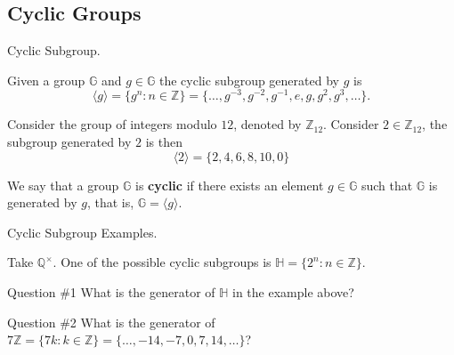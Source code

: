 \documentclass{beamer}
\begin{document}
  \subsection{Cyclic Groups}

  \begin{frame}{Cyclic Subgroup.}
    \begin{definition}
      Given a group $\mathbb{G}$ and $g \in \mathbb{G}$ the cyclic subgroup generated by $g$ is
      \begin{equation*}
          \langle g \rangle = \{g^n: n \in \mathbb{Z}\} = \{\dots,g^{-3}, g^{-2}, g^{-1}, e, g, g^2, g^3, \dots\}.
      \end{equation*}
    \end{definition}
    \pause

    \begin{example}
        Consider the group of integers modulo $12$, denoted by $\mathbb{Z}_{12}$. Consider $2 \in \mathbb{Z}_{12}$, the subgroup generated by $2$ is then
        \begin{equation*}
            \langle 2 \rangle = \{2,4,6,8,10, 0\}
        \end{equation*}
    \end{example}

    \pause
    \begin{definition}
      We say that a group $\mathbb{G}$ is \textbf{cyclic} if there exists an element $g \in \mathbb{G}$ such that $\mathbb{G}$ is generated by $g$, that is, $\mathbb{G} = \langle g \rangle$.
    \end{definition}
  \end{frame}

  \begin{frame}{Cyclic Subgroup Examples.}
    \begin{example}
      Take $\mathbb{Q}^{\times}$. One of the possible cyclic subgroups is $\mathbb{H}=\{2^n: n \in \mathbb{Z}\}$.\pause
    \end{example}

    \begin{alertblock}{Question \#1}
      What is the generator of $\mathbb{H}$ in the example above?\pause
    \end{alertblock}

    \begin{alertblock}{Question \#2}
      What is the generator of $7\mathbb{Z} = \{7k: k \in \mathbb{Z}\} = \{\dots,-14,-7,0,7,14,\dots\}$?
    \end{alertblock}
  \end{frame}
\end{document}
